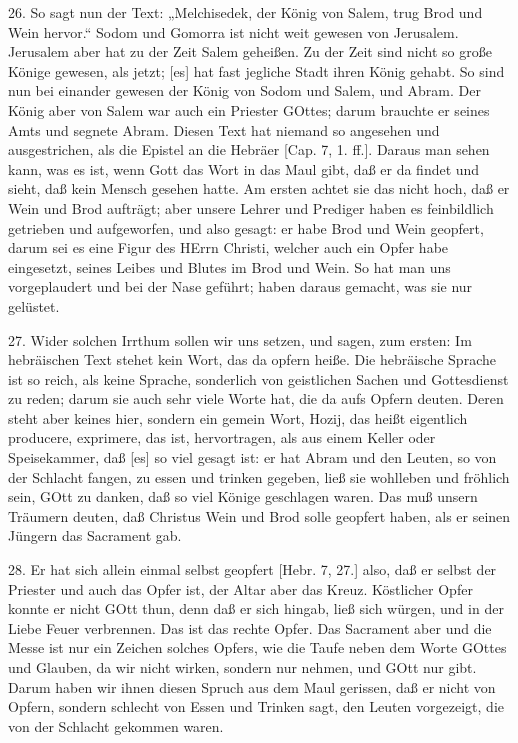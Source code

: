 26. So sagt nun der Text: „Melchisedek, der König von Salem, trug Brod und Wein hervor.“ Sodom und Gomorra ist nicht weit gewesen von Jerusalem. Jerusalem aber hat zu der Zeit Salem geheißen. Zu der Zeit sind nicht so große Könige gewesen, als jetzt; [es] hat fast jegliche Stadt ihren König gehabt. So sind nun bei einander gewesen der König von Sodom und Salem, und Abram. Der König aber von Salem war auch ein Priester GOttes; darum brauchte er seines Amts und segnete Abram. Diesen Text hat niemand so angesehen und ausgestrichen, als die Epistel an die Hebräer [Cap. 7, 1. ff.]. Daraus man sehen kann, was es ist, wenn Gott das Wort in das Maul gibt, daß er da findet und sieht, daß kein Mensch gesehen hatte. Am ersten achtet sie das nicht hoch, daß er Wein und Brod aufträgt; aber unsere Lehrer und Prediger haben es feinbildlich getrieben und aufgeworfen, und also gesagt: er habe Brod und Wein geopfert, darum sei es eine Figur des HErrn Christi, welcher auch ein Opfer habe eingesetzt, seines Leibes und Blutes im Brod und Wein. So hat man uns vorgeplaudert und bei der Nase geführt; haben daraus gemacht, was sie nur gelüstet.

27. Wider solchen Irrthum sollen wir uns setzen, und sagen, zum ersten: Im hebräischen Text stehet kein Wort, das da opfern heiße. Die hebräische Sprache ist so reich, als keine Sprache, sonderlich von geistlichen Sachen und Gottesdienst zu reden; darum sie auch sehr viele Worte hat, die da aufs Opfern deuten. Deren steht aber keines hier, sondern ein gemein Wort, Hozij, das heißt eigentlich producere, exprimere, das ist, hervortragen, als aus einem Keller oder Speisekammer, daß [es] so viel gesagt ist: er hat Abram und den Leuten, so von der Schlacht
fangen, zu essen und trinken gegeben, ließ sie wohlleben und fröhlich sein, GOtt zu danken, daß so viel Könige geschlagen waren. Das muß unsern Träumern deuten, daß Christus Wein und Brod solle geopfert haben, als er seinen Jüngern das Sacrament gab.

28. Er hat sich allein einmal selbst geopfert [Hebr. 7, 27.] also, daß er selbst der Priester und auch das Opfer ist, der Altar aber das Kreuz. Köstlicher Opfer konnte er nicht GOtt thun, denn daß er sich hingab, ließ sich würgen, und in der Liebe Feuer verbrennen. Das ist das rechte Opfer. Das Sacrament aber und die Messe ist nur ein Zeichen solches Opfers, wie die Taufe neben dem Worte GOttes und Glauben, da wir nicht wirken, sondern nur nehmen, und GOtt nur gibt. Darum haben wir ihnen diesen Spruch aus dem Maul gerissen, daß er nicht von Opfern, sondern schlecht von Essen und Trinken sagt, den Leuten vorgezeigt, die von der Schlacht gekommen waren.

